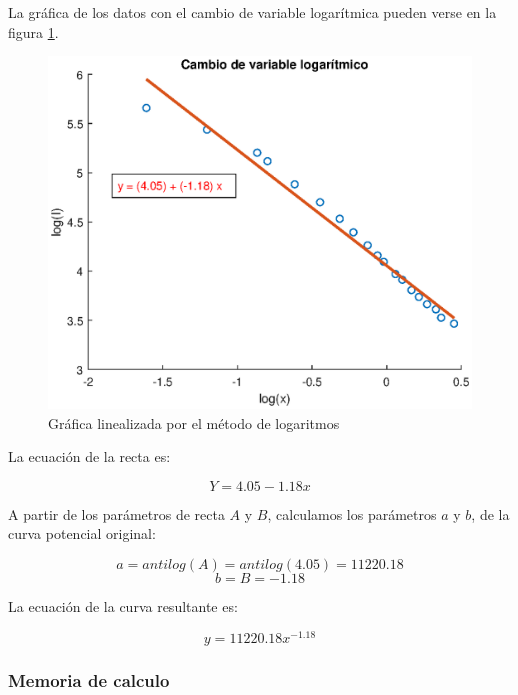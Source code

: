 \documentclass[letter,11pt]{article}
\begin{document}
La gráfica de los datos con el cambio de variable logarítmica pueden verse en la
figura \ref{practica31_2}.

\begin{figure}[!h]
\centering
\includegraphics[scale=1.00]{eps/practica31_2.eps}
\caption{Gráfica linealizada por el método de logaritmos}
\label{practica31_2}
\end{figure}

La ecuación de la recta es:

\begin{equation}
    Y = 4.05 - 1.18 x
\end{equation}

A partir de los parámetros de recta $A$ y $B$, calculamos los parámetros $a$ y
$b$, de la curva potencial original:

\begin{equation*}
    a = antilog(A) = antilog(4.05) = 11220.18
\end{equation*}
\begin{equation*}
    b = B = -1.18
\end{equation*}

La ecuación de la curva resultante es:

\begin{equation}
    y = 11220.18 x^{-1.18}
\end{equation}

\subsubsection{Memoria de calculo}
\end{document}
